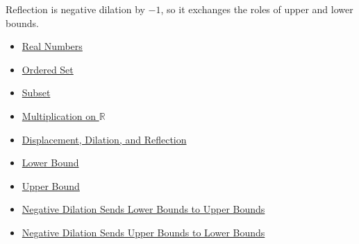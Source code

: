 \begin{remark*}[Interpretation]
Reflection is negative dilation by $-1$, so it exchanges the roles of upper
and lower bounds.
\end{remark*}

\begin{dependencies}
\begin{itemize}
  \item \hyperref[def:reals]{Real Numbers}
  \item \hyperref[def:ordered-set]{Ordered Set}
  \item \hyperref[def:subset]{Subset}
  \item \hyperref[def:multiplication-on-r]{Multiplication on $\mathbb{R}$}
  \item \hyperref[def:displacement-dilation-reflection]{Displacement, Dilation, and Reflection}
  \item \hyperref[def:real-lower-bound]{Lower Bound}
  \item \hyperref[def:real-upper-bound]{Upper Bound}
  \item \hyperref[prop:negative-dilation-sends-lower-to-upper-bounds]{Negative Dilation Sends Lower Bounds to Upper Bounds}
  \item \hyperref[prop:negative-dilation-sends-upper-to-lower-bounds]{Negative Dilation Sends Upper Bounds to Lower Bounds}
\end{itemize}
\end{dependencies}
